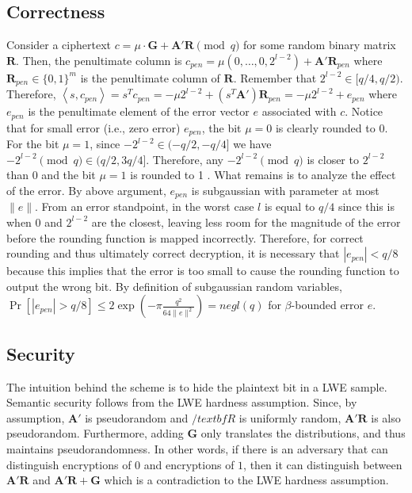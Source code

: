 \subsection*{Correctness}
Consider a ciphertext $c = \mu \cdot \mathbf{G} + \mathbf{A}'\mathbf{R} \pmod q$ for some random binary matrix $\mathbf{R}$. Then, the penultimate column is $c_{pen} = \mu (0, \dots, 0, 2^{l-2}) + \mathbf{A}' \mathbf{R}_{pen}$ where $\mathbf{R}_{pen} \in \{0,1\}^{m}$ is the penultimate column of $\mathbf{R}$. Remember that $2^{l-2} \in [q/4, q/2)$. Therefore, $\left \langle s, c_{pen} \right \rangle = s^Tc_{pen} = - \mu 2^{l-2} + (s^T \mathbf{A}') \mathbf{R}_{pen} = - \mu 2^{l-2} + e_{pen}$ where $e_{pen}$ is the penultimate element of the error vector $e$ associated with $c$. Notice that for small error (i.e., zero error) $e_{pen}$, the bit $\mu = 0$ is clearly rounded to 0. For the bit $\mu = 1$, since $-2^{l-2} \in (-q/2, -q/4]$ we have $-2^{l-2} \pmod q \in (q/2, 3q/4]$. Therefore, any $-2^{l-2} \pmod q$ is closer to $2^{l-2}$ than $0$ and the bit $\mu = 1$ is rounded to 1 . What remains is to analyze the effect of the error. By above argument, $e_{pen}$ is subgaussian with parameter at most $\|e\|$. From an error standpoint, in the worst case $l$ is equal to $q/4$ since this is when $0$ and $2^{l-2}$ are the closest, leaving less room for the magnitude of the error before the rounding function is mapped incorrectly. Therefore, for correct rounding and thus ultimately correct decryption, it is necessary that $|e_{pen}| < q/8$ because this implies that the error is too small to cause the rounding function to output the wrong bit. By definition of subgaussian random variables, $\operatorname{Pr}[|e_{pen}| > q/8] \leq 2\exp \left(- \pi \frac{q^2}{64\|e\|^2} \right) = negl(q)$ for $\beta$-bounded error $e$. 

\subsection*{Security}
The intuition behind the scheme is to hide the plaintext bit in a LWE sample. Semantic security follows from the LWE hardness assumption. Since, by assumption, $\mathbf{A}'$ is pseudorandom and $/textbf{R}$ is uniformly random, $\mathbf{A}'\mathbf{R}$ is also pseudorandom. Furthermore, adding $\mathbf{G}$ only translates the distributions, and thus maintains pseudorandomness. In other words, if there is an adversary that can distinguish encryptions of $0$ and encryptions of $1$, then it can distinguish between $\mathbf{A}'\mathbf{R}$ and $\mathbf{A}'\mathbf{R} + \mathbf{G}$ which is a contradiction to the LWE hardness assumption. 

